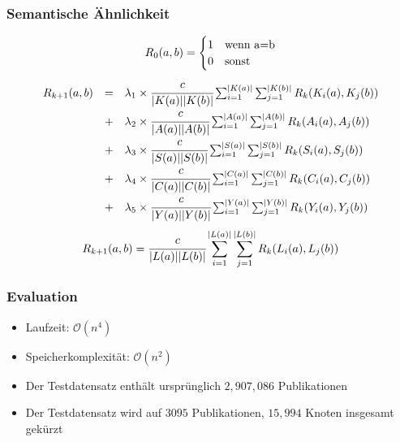 \documentclass[12pt, xcolor=table]{beamer}
\begin{document}
\begin{frame}
    \frametitle{Semantische Ähnlichkeit}
\scriptsize{
\[
 R_0(a,b) =
    \begin{cases}
     1 & \text{wenn } $a$ = $b$ \\
     0 & \text{sonst}\\
    \end{cases}
\]
\newline
{}
\[
\begin{array}{lcl}
 R_{k+1}(a,b) & = & 
        \lambda_1\times\cfrac{c}{|K(a)||K(b)|}
        \sum_{i=1}^{|K(a)|} \sum_{j=1}^{|K(b)|} R_k(K_i(a),K_j(b))
        \\ & + &
        \lambda_2\times\cfrac{c}{|A(a)||A(b)|}
        \sum_{i=1}^{|A(a)|} \sum_{j=1}^{|A(b)|} R_k(A_i(a),A_j(b))
        \\ & + &
        \lambda_3\times\cfrac{c}{|S(a)||S(b)|}
        \sum_{i=1}^{|S(a)|} \sum_{j=1}^{|S(b)|} R_k(S_i(a),S_j(b))
        \\ & + &
        \lambda_4\times\cfrac{c}{|C(a)||C(b)|}
        \sum_{i=1}^{|C(a)|} \sum_{j=1}^{|C(b)|} R_k(C_i(a),C_j(b))
        \\ & + &
        \lambda_5\times\cfrac{c}{|Y(a)||Y(b)|}
        \sum_{i=1}^{|Y(a)|} \sum_{j=1}^{|Y(b)|} R_k(Y_i(a),Y_j(b))
\end{array}
\]
\newline
{}
\[
R_{k+1}(a,b)  = 
        \cfrac{c}{|L(a)||L(b)|}
        \sum_{i=1}^{|L(a)|} \sum_{j=1}^{|L(b)|} R_k(L_i(a),L_j(b))
\]
}
\end{frame}

\begin{frame}
    \frametitle{Evaluation}
    \begin{itemize}
        \item Laufzeit: $\mathcal{O}(n^4)$
        \item Speicherkomplexität: $\mathcal{O}(n^2)$
        \item Der Testdatensatz enthält ursprünglich $2,907,086$ Publikationen
        \item Der Testdatensatz wird auf $3095$ Publikationen, $15,994$ Knoten insgesamt gekürzt
    \end{itemize}
\end{frame}
\end{document}
